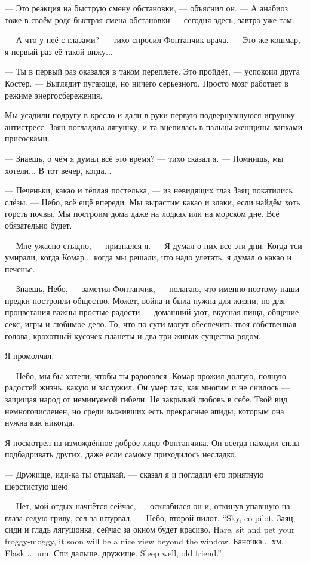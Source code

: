 --- Это реакция на быструю смену обстановки, --- объяснил он.
--- А анабиоз тоже в своём роде быстрая смена обстановки --- сегодня здесь, завтра уже там.

--- А что у неё с глазами? --- тихо спросил Фонтанчик врача.
--- Это же кошмар, я первый раз её такой вижу...

--- Ты в первый раз оказался в таком переплёте.
Это пройдёт, --- успокоил друга Костёр.
--- Выглядит пугающе, но ничего серьёзного.
Просто мозг работает в режиме энергосбережения.

Мы усадили подругу в кресло и дали в руки первую подвернувшуюся игрушку-антистресс.
Заяц погладила лягушку, и та вцепилась в пальцы женщины лапками-присосками.

--- Знаешь, о чём я думал всё это время? --- тихо сказал я.
--- Помнишь, мы хотели...
В тот вечер, когда...

--- Печеньки, какао и тёплая постелька, --- из невидящих глаз Заяц покатились слёзы.
--- Небо, всё ещё впереди.
Мы вырастим какао и злаки, если найдём хоть горсть почвы.
Мы построим дома даже на лодках или на морском дне.
Всё обязательно будет.

--- Мне ужасно стыдно, --- признался я.
--- Я думал о них все эти дни.
Когда тси умирали, когда Комар... когда мы решали, что надо улетать, я думал о какао и печенье.

--- Знаешь, Небо, --- заметил Фонтанчик, --- полагаю, что именно поэтому наши предки построили общество.
Может, война и была нужна для жизни, но для процветания важны простые радости --- домашний уют, вкусная пища, общение, секс, игры и любимое дело.
То, что по сути могут обеспечить твоя собственная голова, крохотный кусочек планеты и два-три живых существа рядом.

Я промолчал.

--- Небо, мы бы хотели, чтобы ты радовался.
Комар прожил долгую, полную радостей жизнь, какую и заслужил.
Он умер так, как многим и не снилось --- защищая народ от неминуемой гибели.
Не закрывай любовь в себе.
Твой вид немногочисленен, но среди выживших есть прекрасные апиды, которым она нужна как никогда.

Я посмотрел на измождённое доброе лицо Фонтанчика.
Он всегда находил силы подбадривать других, даже если самому приходилось несладко.

--- Дружище, иди-ка ты отдыхай, --- сказал я и погладил его приятную шерстистую шею.

--- Нет, мой отдых начнётся сейчас, --- осклабился он и, откинув упавшую на глаза седую гриву, сел за штурвал.
{--- Небо, второй пилот.}
{``Sky, co-pilot.}
{Заяц, сиди и гладь лягушонка, сейчас за окном будет красиво.}
{Hare, sit and pet your froggy-moggy, it soon will be a nice view beyond the window.}
{Баночка... хм.}
{Flask ... um.}
{Спи дальше, дружище.}
{Sleep well, old friend.''}

